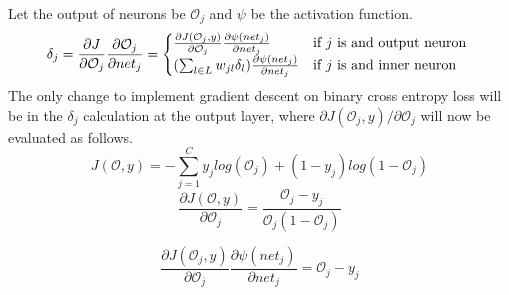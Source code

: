 \documentclass[11pt]{article}
\begin{document}
Let the output of neurons be $\mathcal{O}_j$ and $\psi$ be the activation function.
\begin{equation*}
    \centering
    \begin{split}        
        \delta_j = \frac{\partial J}{\partial \mathcal{O}_j}\frac{\partial \mathcal{O}_j}{\partial net_j} = \begin{cases}
        \frac{\partial J(\mathcal{O}_j,y)}{\partial \mathcal{O}_j}\frac{\partial\psi(net_j)}{\partial net_j} & \text{if $j$ is and output neuron } \\
        (\sum_{l\in L} w_{jl}\delta_l)\frac{\partial\psi(net_j)}{\partial net_j} & \text{if $j$ is and inner neuron }\\
    \end{cases}
    \end{split}
\end{equation*}
The only change to implement gradient descent on binary cross entropy loss will be in the $\delta_j$ calculation at the output layer, where ${\partial J(\mathcal{O}_j,y)}/{\partial \mathcal{O}_j}$ will now be evaluated as follows.
\begin{equation}
        J(\mathcal{O},y) = -\sum_{j = 1}^{C}{y_jlog(\mathcal{O}_j) + (1-y_j)log(1-\mathcal{O}_j)}
        \end{equation}
    \begin{equation*}
             \frac{\partial J(\mathcal{O},y)}{\partial\mathcal{O}_j} = \frac{\mathcal{O}_j-y_j}{\mathcal{O}_j(1-\mathcal{O}_j)}
    \end{equation*}
        
    \begin{equation*}
         \frac{\partial J(\mathcal{O}_j,y)}{\partial \mathcal{O}_j}\frac{\partial\psi(net_j)}{\partial net_j} = \mathcal{O}_j-y_j
    \end{equation*}
        
\end{document}
